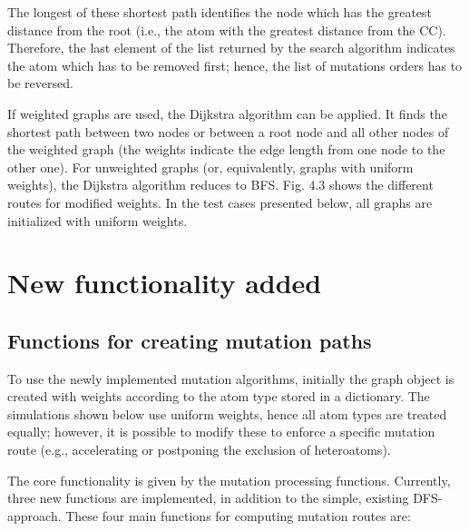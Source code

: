 The longest of these shortest path identifies the node which has the greatest
distance from the root (i.e., the atom with the greatest distance from
the CC). Therefore, the last element of the list returned by the search algorithm indicates the atom which has to be removed first; hence, the list of mutations orders has to be reversed.

If weighted graphs are used, the Dijkstra algorithm can be applied.
It finds the shortest path between two nodes or between a root node
and all other nodes of the weighted graph (the weights indicate the
edge length from one node to the other one). For unweighted graphs
(or, equivalently, graphs with uniform weights), the Dijkstra algorithm
reduces to BFS. Fig. 4.3 shows the different routes for modified weights.
In the test cases presented below, all graphs are initialized with uniform weights.

\section{New functionality added}

\subsection{Functions for creating mutation paths}

To use the newly implemented mutation algorithms, initially the graph object
is created with weights according to the atom type stored in a dictionary. The simulations shown
below use uniform weights, hence all atom types are treated equally; however, it is possible to modify these to
enforce a specific mutation route (e.g., accelerating or postponing
the exclusion of heteroatoms). 

The core functionality is given by the mutation processing functions.
Currently, three new functions are implemented, in addition to
the simple, existing DFS-approach.
These four main functions for computing mutation routes are:

